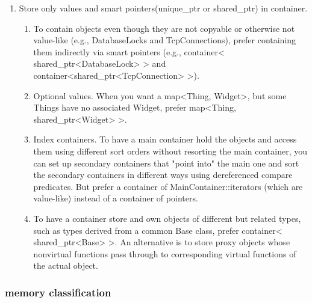 \documentclass[a4paper,11pt,twoside]{book}
\begin{document}
\begin{itemize}
\begin{enumerate}
\item Store only values and smart pointers(unique\_ptr or shared\_ptr) in container.
\begin{enumerate}
\item To contain objects even though they are
not copyable or otherwise not value-like (e.g., DatabaseLocks and
TcpConnections), prefer containing them indirectly via smart pointers (e.g.,
container< shared\_ptr<DatabaseLock> > and container<shared\_ptr<TcpConnection> >).
\item Optional values. When you want a map<Thing, Widget>, but some
Things have no associated Widget, prefer map<Thing, shared\_ptr<Widget> >.
\item Index containers. To have a main container hold the objects and access them using different sort orders without resorting the main container, you can set up secondary containers that "point into" the main one and sort the secondary containers in different ways using dereferenced compare predicates. But prefer a container of MainContainer::iterators (which are value-like) instead of a container of pointers.

\item To have a container store and own objects of different but related types, such as types derived from a common Base class, prefer container< shared\_ptr<Base> >. An alternative is to store proxy objects whose nonvirtual functions pass through to corresponding virtual functions of the actual object.
\end{enumerate}

\end{enumerate}

\end{itemize}


\subsubsection{memory classification}
\end{document}

